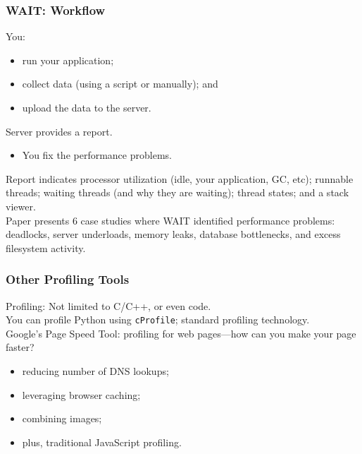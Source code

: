 \begin{frame}
  \frametitle{WAIT: Workflow}

\large
\begin{changemargin}{1.5cm}

You:
\begin{itemize}
\item run your application;
\item collect data (using a script or manually); and 
\item upload the data to the server.
\end{itemize}
Server provides
a report.\\
\begin{itemize}
\item You fix the performance problems.\\[1em]
\end{itemize}

Report indicates processor utilization (idle, your application, GC, 
etc); runnable threads; waiting threads (and why they are waiting); 
thread states; and a stack viewer.\\[1em]

Paper presents 6 case studies where WAIT identified performance
problems: deadlocks, server underloads, memory leaks, database
bottlenecks, and excess filesystem activity.

\end{changemargin}
\end{frame}


\begin{frame}[fragile]
  \frametitle{Other Profiling Tools}

  
\large
\begin{changemargin}{1.5cm}
    Profiling: Not limited to C/C++, or even code.\\[1em]

    You can profile Python using {\tt cProfile}; standard profiling technology.\\[1em]

    Google's Page Speed Tool: profiling for web pages---how can you make your page faster?\\
\begin{itemize}
\item reducing number of DNS lookups;
\item leveraging browser caching;
\item combining images;
\item plus, traditional JavaScript profiling.
\end{itemize}
\end{changemargin}
\end{frame}





